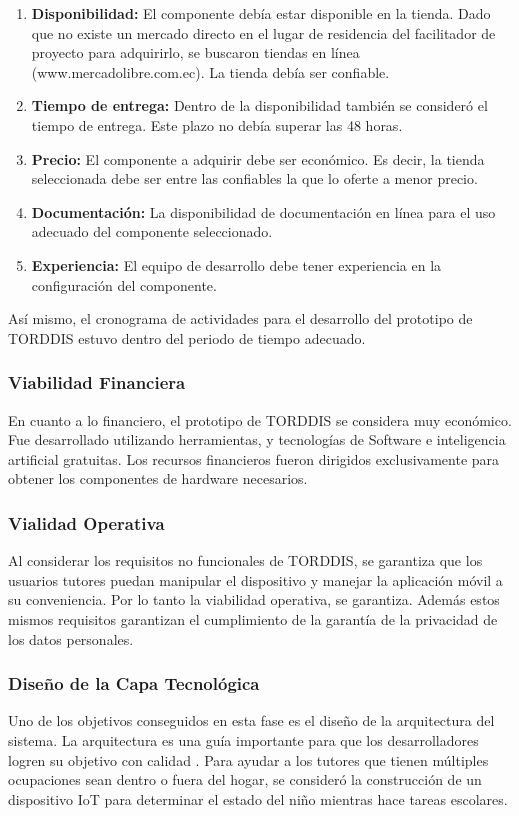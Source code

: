 \documentclass[a4paper,fleqn]{cas-sc}
\begin{document}
					\begin{enumerate}
						\item \textbf{Disponibilidad:} El componente debía estar disponible en la tienda. Dado que no existe un mercado directo en el lugar de residencia del facilitador de proyecto para adquirirlo, se buscaron tiendas en línea (www.mercadolibre.com.ec). La tienda debía ser confiable. 
						\item \textbf{Tiempo de entrega:} Dentro de la disponibilidad también se consideró el tiempo de entrega. Este plazo no debía superar las 48 horas.
						\item \textbf{Precio:} El componente a adquirir debe ser económico. Es decir, la tienda seleccionada debe ser entre las confiables la que lo oferte a menor precio.
						\item \textbf{Documentación:} La disponibilidad de documentación en línea para el uso adecuado del componente seleccionado.
						\item \textbf{Experiencia:} El equipo de desarrollo debe tener experiencia en la configuración del componente.
					\end{enumerate}
				
					Así mismo, el cronograma de actividades para el desarrollo del prototipo de TORDDIS estuvo dentro del periodo de tiempo adecuado.
				
				\subsubsection*{Viabilidad Financiera}
					En cuanto a lo financiero, el prototipo de TORDDIS se considera muy económico. Fue desarrollado utilizando herramientas, y tecnologías de Software e inteligencia artificial gratuitas. Los recursos financieros fueron dirigidos exclusivamente para obtener los componentes de hardware necesarios.
				
				\subsubsection*{Vialidad Operativa}
					Al considerar los requisitos no funcionales de TORDDIS, se garantiza que los usuarios tutores puedan manipular el dispositivo y manejar la aplicación móvil a su conveniencia. Por lo tanto la viabilidad operativa, se garantiza. Además estos mismos requisitos garantizan el cumplimiento de la garantía de la privacidad de los datos personales.
			
			\subsubsection{Diseño de la Capa Tecnológica}
				Uno de los objetivos conseguidos en esta fase es el diseño de la arquitectura del sistema. La arquitectura es una guía importante para que los desarrolladores logren su objetivo con calidad \citep{Liu2011Status}. Para ayudar a los tutores que tienen múltiples ocupaciones sean dentro o fuera del hogar, se consideró la construcción de un dispositivo IoT para determinar el estado del niño mientras hace tareas escolares. 
			
\end{document}
